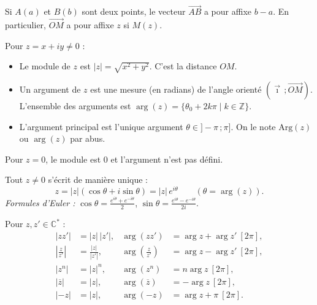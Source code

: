 \documentclass[11pt]{article}
\newcommand{\cle}[1]{{\popxbold\color{popdark}#1}}
\begin{document}
\begin{propriete}
Si $A(a)$ et $B(b)$ sont deux points, le vecteur $\overrightarrow{AB}$ a pour affixe $b-a$. En particulier, $\overrightarrow{OM}$ a pour affixe $z$ si $M(z)$.
\end{propriete}

\begin{definition}
Pour $z=x+iy \neq 0$ :
\begin{itemize}
\item Le \cle{module} de $z$ est $|z|=\sqrt{x^2+y^2}$. C'est la distance $OM$.
\item Un \cle{argument} de $z$ est une mesure (en radians) de l'angle orienté $(\vec{\imath}\,;\overrightarrow{OM})$. L'ensemble des arguments est $\arg(z)=\{\theta_0+2k\pi \mid k\in\mathbb{Z}\}$.
\item L'\cle{argument principal} est l'unique argument $\theta \in ]-\pi\,;\pi]$. On le note $\mathrm{Arg}(z)$ ou $\arg(z)$ par abus.
\end{itemize}
Pour $z=0$, le module est $0$ et l'argument n'est pas défini.
\end{definition}

\begin{propriete}
Tout $z\neq 0$ s'écrit de manière unique :
\[ z = |z|(\cos\theta + i\sin\theta) = |z|\,e^{i\theta} \qquad (\theta = \arg(z)). \]
\emph{Formules d'Euler :} $\cos\theta = \frac{e^{i\theta}+e^{-i\theta}}{2}$, $\sin\theta = \frac{e^{i\theta}-e^{-i\theta}}{2i}$.
\end{propriete}

\begin{propriete}
Pour $z,z'\in\mathbb{C}^*$ :
\begin{align*}
|zz'| &= |z|\,|z'|, & \arg(zz') &= \arg z + \arg z' \ [2\pi],\\
\left|\frac{z}{z'}\right| &= \frac{|z|}{|z'|}, & \arg\left(\frac{z}{z'}\right) &= \arg z - \arg z' \ [2\pi],\\
|z^n| &= |z|^n, & \arg(z^n) &= n\arg z \ [2\pi],\\
|\overline{z}| &= |z|, & \arg(\overline{z}) &= -\arg z \ [2\pi],\\
|-z| &= |z|, & \arg(-z) &= \arg z + \pi \ [2\pi].
\end{align*}
\end{propriete}
\end{document}
